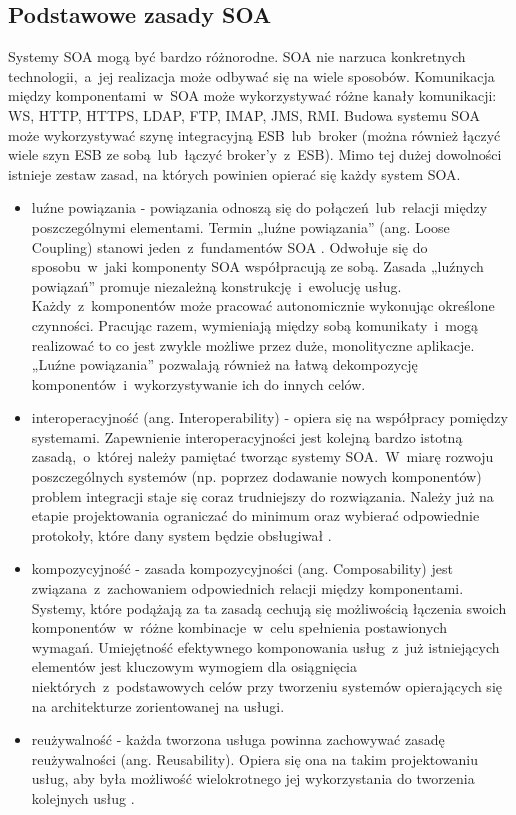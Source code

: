 \subsection{Podstawowe zasady SOA}
Systemy SOA mogą być bardzo różnorodne. SOA nie narzuca konkretnych technologii,~a~jej realizacja może odbywać się na wiele sposobów. Komunikacja między komponentami~w~SOA może wykorzystywać różne kanały komunikacji: WS, HTTP, HTTPS, LDAP, FTP, IMAP, JMS, RMI. Budowa systemu SOA może wykorzystywać szynę integracyjną ESB~lub~broker (można również łączyć wiele szyn ESB ze sobą~lub~łączyć broker’y~z~ESB). Mimo tej dużej dowolności istnieje zestaw zasad, na których powinien opierać się każdy system SOA.
\begin{itemize}
\item{luźne powiązania - powiązania odnoszą się do połączeń~lub~relacji między poszczególnymi elementami. Termin „luźne powiązania” (ang. Loose Coupling) stanowi jeden~z~fundamentów SOA \cite{SOAsdj102009}. Odwołuje się do sposobu~w~jaki komponenty SOA współpracują ze sobą.  Zasada „luźnych powiązań” promuje niezależną konstrukcję~i~ewolucję usług. Każdy~z~komponentów może pracować autonomicznie wykonując określone czynności. Pracując razem, wymieniają między sobą komunikaty~i~mogą realizować to co jest zwykle możliwe przez duże, monolityczne aplikacje. „Luźne powiązania” pozwalają również na łatwą dekompozycję komponentów~i~wykorzystywanie ich do innych celów.}
\item{interoperacyjność (ang. Interoperability) - opiera się na współpracy pomiędzy systemami. Zapewnienie interoperacyjności jest kolejną bardzo istotną zasadą,~o~której należy pamiętać tworząc systemy SOA.~W~miarę rozwoju poszczególnych systemów (np. poprzez dodawanie nowych komponentów) problem integracji staje się coraz trudniejszy do rozwiązania. Należy już na etapie projektowania ograniczać do minimum oraz wybierać odpowiednie protokoły, które dany system będzie obsługiwał \cite{SOAsdj102009}.}
\item{kompozycyjność - zasada kompozycyjności (ang. Composability) jest związana~z~zachowaniem odpowiednich relacji między komponentami. Systemy, które podążają za ta zasadą cechują się możliwością łączenia swoich komponentów~w~różne kombinacje~w~celu spełnienia postawionych wymagań. Umiejętność efektywnego komponowania usług~z~już istniejących elementów jest kluczowym wymogiem dla osiągnięcia niektórych~z~podstawowych celów przy tworzeniu systemów opierających się na architekturze zorientowanej na usługi.}
\item{reużywalność - każda tworzona usługa powinna zachowywać zasadę reużywalności (ang. Reusability).  Opiera się ona na takim projektowaniu usług, aby była możliwość wielokrotnego jej wykorzystania do tworzenia kolejnych usług \cite{SOAsdj102009}.}

\end{itemize}
